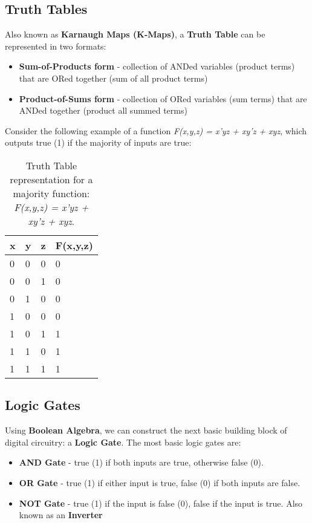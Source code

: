 \documentclass[pdftex,10pt]{article}
\begin{document}
\subsection{Truth Tables}

Also known as \textbf{Karnaugh Maps (K-Maps)}, a \textbf{Truth Table} can be represented in two formats:
\begin{itemize}
    \item \textbf{Sum-of-Products form} - collection of ANDed variables (product terms) that are ORed together (sum of all product terms)
    \item \textbf{Product-of-Sums form} - collection of ORed variables (sum terms) that are ANDed together (product all summed terms)
\end{itemize}


Consider the following example of a function \textit{F(x,y,z) = x'yz + xy'z + xyz}, which outputs true (1) if the majority of inputs are true:

\begin{table}[htbp]
    \abovedisplayskip=-5pt
    \belowdisplayskip=-5pt
    \centering
    \begin{tabularx}{\textwidth}{| X | X | X | X |}
        \hline
        x & y & z & F(x,y,z) \\ \hline
        0 & 0 & 0 & 0        \\ \hline
        0 & 0 & 1 & 0        \\ \hline
        0 & 1 & 0 & 0        \\ \hline
        1 & 0 & 0 & 0        \\ \hline
        1 & 0 & 1 & 1        \\ \hline
        1 & 1 & 0 & 1        \\ \hline
        1 & 1 & 1 & 1        \\ \hline
    \end{tabularx}
    \caption{Truth Table representation for a majority function:\\ \textit{F(x,y,z) = x'yz + xy'z + xyz}.}

\end{table}


\subsection{Logic Gates}

Using \textbf{Boolean Algebra}, we can construct the next basic building block of digital circuitry: a \textbf{Logic Gate}. The most basic logic gates are:
\begin{itemize}
    \item \textbf{AND Gate} - true (1) if both inputs are true, otherwise false (0).
    \item \textbf{OR Gate} - true (1) if either input is true, false (0) if both inputs are false.
    \item \textbf{NOT Gate} - true (1) if the input is false (0), false if the input is true. Also known as an \textbf{Inverter}
\end{itemize}
\end{document}
